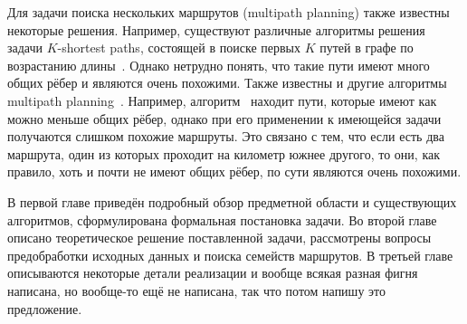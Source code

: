 Для задачи поиска нескольких маршрутов (multipath planning) также
известны некоторые решения. Например, существуют различные алгоритмы
решения задачи $K$-shortest paths, состоящей в поиске первых $K$ путей
в графе по возрастанию длины~\cite{eppstein1998finding,
yen1971finding}. Однако нетрудно понять, что такие пути имеют много
общих рёбер и являются очень похожими. Также известны и другие
алгоритмы multipath planning~\cite{lim2005shortest,
dial1971probabilistic, mafast}. Например,
алгоритм~\cite{lim2005shortest} находит пути, которые имеют как можно
меньше общих рёбер, однако при его применении к имеющейся задачи
получаются слишком похожие маршруты. Это связано с тем, что если есть
два маршрута, один из которых проходит на километр южнее другого, то
они, как правило, хоть и почти не имеют общих рёбер, по сути являются
очень похожими.


В первой главе приведён подробный обзор предметной области и
существующих алгоритмов, сформулирована формальная постановка задачи.
Во второй главе описано теоретическое решение поставленной задачи,
рассмотрены вопросы предобработки исходных данных и поиска семейств
маршрутов. В третьей главе описываются некоторые детали реализации и
вообще всякая разная фигня написана, но вообще-то ещё не написана, так
что потом напишу это предложение.

\FloatBarrier

